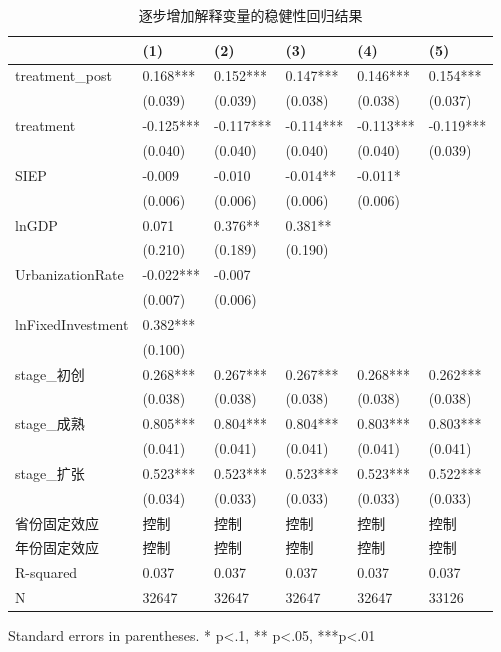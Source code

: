\begin{table}
\caption{逐步增加解释变量的稳健性回归结果}
\label{}
\begin{center}
\begin{tabular}{llllll}
\hline
                  & (1)       & (2)       & (3)       & (4)       & (5)        \\
\hline
treatment\_post   & 0.168***  & 0.152***  & 0.147***  & 0.146***  & 0.154***   \\
                  & (0.039)   & (0.039)   & (0.038)   & (0.038)   & (0.037)    \\
treatment         & -0.125*** & -0.117*** & -0.114*** & -0.113*** & -0.119***  \\
                  & (0.040)   & (0.040)   & (0.040)   & (0.040)   & (0.039)    \\
SIEP            & -0.009    & -0.010    & -0.014**  & -0.011*   &            \\
                  & (0.006)   & (0.006)   & (0.006)   & (0.006)   &            \\
lnGDP             & 0.071     & 0.376**   & 0.381**   &           &            \\
                  & (0.210)   & (0.189)   & (0.190)   &           &            \\
UrbanizationRate              & -0.022*** & -0.007    &           &           &            \\
                  & (0.007)   & (0.006)   &           &           &            \\
lnFixedInvestment & 0.382***  &           &           &           &            \\
                  & (0.100)   &           &           &           &            \\
stage\_初创         & 0.268***  & 0.267***  & 0.267***  & 0.268***  & 0.262***   \\
                  & (0.038)   & (0.038)   & (0.038)   & (0.038)   & (0.038)    \\
stage\_成熟         & 0.805***  & 0.804***  & 0.804***  & 0.803***  & 0.803***   \\
                  & (0.041)   & (0.041)   & (0.041)   & (0.041)   & (0.041)    \\
stage\_扩张         & 0.523***  & 0.523***  & 0.523***  & 0.523***  & 0.522***   \\
                  & (0.034)   & (0.033)   & (0.033)   & (0.033)   & (0.033)    \\
省份固定效应  & 控制 & 控制 & 控制 & 控制 & 控制 \\ 
 年份固定效应  & 控制 & 控制 & 控制 & 控制 & 控制 \\ 
\hline

R-squared         & 0.037     & 0.037     & 0.037     & 0.037     & 0.037      \\
N                 & 32647     & 32647     & 32647     & 32647     & 33126      \\
\hline
\end{tabular}
\end{center}
\end{table}
\bigskip
Standard errors in parentheses. \newline 
* p<.1, ** p<.05, ***p<.01

